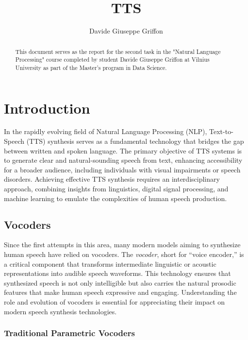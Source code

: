 \documentclass[12pt]{article}
\title{TTS}
\author{Davide Giuseppe Griffon}
\date{}
\begin{document}
\maketitle

\begin{abstract}
    This document serves as the report for the second task in the "Natural Language Processing" course completed by student Davide Giuseppe Griffon at Vilnius University as part of the Master's program in Data Science.
\end{abstract}

\tableofcontents

\newpage

\section{Introduction}

In the rapidly evolving field of Natural Language Processing (NLP), Text-to-Speech (TTS) synthesis serves as a fundamental technology that bridges the gap between written and spoken language. The primary objective of TTS systems is to generate clear and natural-sounding speech from text, enhancing accessibility for a broader audience, including individuals with visual impairments or speech disorders. Achieving effective TTS synthesis requires an interdisciplinary approach, combining insights from linguistics, digital signal processing, and machine learning to emulate the complexities of human speech production.

\subsection{Vocoders}
Since the first attempts in this area, many modern models aiming to synthesize human speech have relied on vocoders. The \textit{vocoder}, short for ``voice encoder,'' is a critical component that transforms intermediate linguistic or acoustic representations into audible speech waveforms. This technology ensures that synthesized speech is not only intelligible but also carries the natural prosodic features that make human speech expressive and engaging. Understanding the role and evolution of vocoders is essential for appreciating their impact on modern speech synthesis technologies.

\subsubsection{Traditional Parametric Vocoders}
\end{document}
